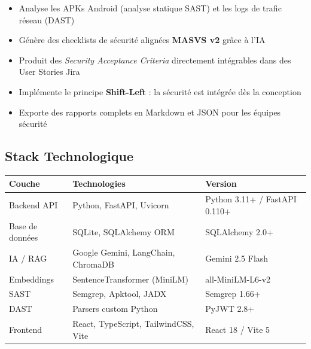 \documentclass[12pt,a4paper,french]{article}
\begin{document}
\begin{itemize}[leftmargin=1.5cm, itemsep=4pt]
  \item[\textcolor{primary}{$\blacktriangleright$}]
    Analyse les APKs Android (analyse statique SAST) et les logs de trafic réseau (DAST)
  \item[\textcolor{primary}{$\blacktriangleright$}]
    Génère des checklists de sécurité alignées \textbf{MASVS v2} grâce à l'IA
  \item[\textcolor{primary}{$\blacktriangleright$}]
    Produit des \textit{Security Acceptance Criteria} directement intégrables dans des User Stories Jira
  \item[\textcolor{primary}{$\blacktriangleright$}]
    Implémente le principe \textbf{Shift-Left} : la sécurité est intégrée dès la conception
  \item[\textcolor{primary}{$\blacktriangleright$}]
    Exporte des rapports complets en Markdown et JSON pour les équipes sécurité
\end{itemize}

\subsection{Stack Technologique}

\begin{center}
\renewcommand{\arraystretch}{1.4}
\begin{tabular}{lll}
\toprule
\textbf{Couche} & \textbf{Technologies} & \textbf{Version} \\
\midrule
\rowcolor{primary!6}
Backend API     & Python, FastAPI, Uvicorn            & Python 3.11+ / FastAPI 0.110+ \\
Base de données & SQLite, SQLAlchemy ORM              & SQLAlchemy 2.0+ \\
\rowcolor{primary!6}
IA / RAG        & Google Gemini, LangChain, ChromaDB  & Gemini 2.5 Flash \\
Embeddings      & SentenceTransformer (MiniLM)        & all-MiniLM-L6-v2 \\
\rowcolor{primary!6}
SAST            & Semgrep, Apktool, JADX              & Semgrep 1.66+ \\
DAST            & Parsers custom Python               & PyJWT 2.8+ \\
\rowcolor{primary!6}
Frontend        & React, TypeScript, TailwindCSS, Vite & React 18 / Vite 5 \\
\bottomrule
\end{tabular}
\end{center}
\end{document}
